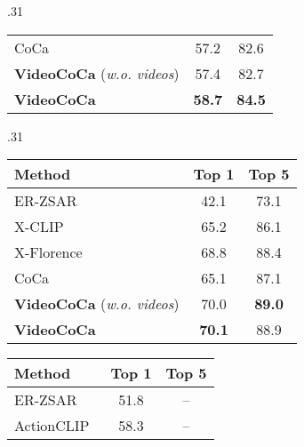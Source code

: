 \begin{table*}[t]
\begin{subtable}[t]{.31\linewidth}
{\begin{tabular}{lcc}
  				\midrule
  				CoCa &  57.2 &  82.6  \\  \textbf{VideoCoCa} (\textit{w.o. videos}) & 57.4 & 82.7 \\ \textbf{VideoCoCa} 	& \textbf{58.7} & \textbf{84.5}  \\ \bottomrule
  			\end{tabular}
  			\label{tab:sota_hmdb51}
  		}	
	\end{subtable}
\begin{subtable}[t]{.31\linewidth}
		\centering
  		\caption{Kinetics 600}
  		\setlength{\tabcolsep}{4pt} \vspace{-0.3\baselineskip}
  		\scriptsize{
	  		\begin{tabular}{lcc}
	  			\toprule
	  			Method 	& Top 1  & Top 5  \\ \midrule
	  			ER-ZSAR~\cite{chen2021elaborative} & 42.1  & 73.1 \\ X-CLIP~\cite{ni2022XCLIP} & 65.2  & 86.1 \\ X-Florence~\cite{ni2022XCLIP} & 68.8  & 88.4 \\ \midrule
  				CoCa & 65.1 & 87.1  \\
	  			\textbf{VideoCoCa} (\textit{w.o. videos}) & 70.0 & \textbf{89.0} \\ \textbf{VideoCoCa} 	& \textbf{70.1} & 88.9  \\ \bottomrule
	  		\end{tabular}
	  		\label{tab:sota_kinetics600}
  		}
  		\vspace{0.3\baselineskip} \centering
		\caption{UCF 101}
		\vspace{-0.2\baselineskip}
			\scriptsize{
  			\begin{tabular}{lcc}
  				\toprule Method
  				& Top 1 & Top 5 \\ 
  				\midrule
  				ER-ZSAR~\cite{chen2021elaborative} 	&  51.8  &  --     \\
  				ActionCLIP~\cite{wang2021actionclip} & 58.3 & -- \\  


\end{tabular}}
\end{subtable}
\end{table*}
